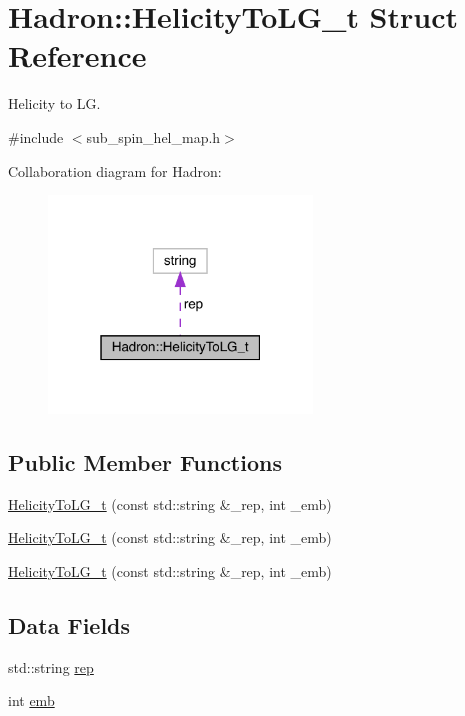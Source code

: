 \hypertarget{structHadron_1_1HelicityToLG__t}{}\section{Hadron\+:\+:Helicity\+To\+L\+G\+\_\+t Struct Reference}
\label{structHadron_1_1HelicityToLG__t}


Helicity to LG.  




{\ttfamily \#include $<$sub\+\_\+spin\+\_\+hel\+\_\+map.\+h$>$}



Collaboration diagram for Hadron\+:\nopagebreak
\begin{figure}[H]
\begin{center}
\leavevmode
\includegraphics[width=199pt]{d8/d52/structHadron_1_1HelicityToLG__t__coll__graph}
\end{center}
\end{figure}
\subsection*{Public Member Functions}
\begin{DoxyCompactItemize}
\item 
\mbox{\hyperlink{structHadron_1_1HelicityToLG__t_a169aa4cb0f221e29db87c404f56eacf6}{Helicity\+To\+L\+G\+\_\+t}} (const std\+::string \&\+\_\+rep, int \+\_\+emb)
\item 
\mbox{\hyperlink{structHadron_1_1HelicityToLG__t_a169aa4cb0f221e29db87c404f56eacf6}{Helicity\+To\+L\+G\+\_\+t}} (const std\+::string \&\+\_\+rep, int \+\_\+emb)
\item 
\mbox{\hyperlink{structHadron_1_1HelicityToLG__t_a169aa4cb0f221e29db87c404f56eacf6}{Helicity\+To\+L\+G\+\_\+t}} (const std\+::string \&\+\_\+rep, int \+\_\+emb)
\end{DoxyCompactItemize}
\subsection*{Data Fields}
\begin{DoxyCompactItemize}
\item 
std\+::string \mbox{\hyperlink{structHadron_1_1HelicityToLG__t_a49a6869a62bf38d55a2cf332750bf365}{rep}}
\item 
int \mbox{\hyperlink{structHadron_1_1HelicityToLG__t_aa2343a2515755f6a1bc6cf802e12a183}{emb}}
\end{DoxyCompactItemize}


